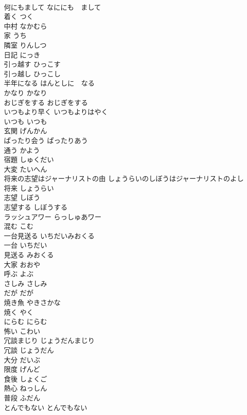 \documentclass[8pt]{extreport}
\begin{document}
\begin{CJK}{UTF8}{min}
\\	何にもまして	なににも　まして	
\\	着く	つく	
\\	中村	なかむら	
\\	家	うち	
\\	隣室	りんしつ	
\\	日記	にっき	
\\	引っ越す	ひっこす	
\\	引っ越し	ひっこし	
\\	半年になる	はんとしに　なる	
\\	かなり	かなり	
\\	おじぎをする	おじぎをする	
\\	いつもより早く	いつもよりはやく	
\\	いつも	いつも	
\\	玄関	げんかん	
\\	ぱったり会う	ぱったりあう	
\\	通う	かよう	
\\	宿題	しゅくだい	
\\	大変	たいへん	
\\	将来の志望はジャーナリストの由	しょうらいのしぼうはジャーナリストのよし	
\\	将来	しょうらい	
\\	志望	しぼう	
\\	志望する	しぼうする	
\\	ラッシュアワー	らっしゅあワー	
\\	混む	こむ	
\\	一台見送る	いちだいみおくる	
\\	一台	いちだい	
\\	見送る	みおくる	
\\	大家	おおや	
\\	呼ぶ	よぶ	
\\	さしみ	さしみ	
\\	だが	だが	
\\	焼き魚	やきさかな	
\\	焼く	やく	
\\	にらむ	にらむ	
\\	怖い	こわい	
\\	冗談まじり	じょうだんまじり	
\\	冗談	じょうだん	
\\	大分	だいぶ	
\\	限度	げんど	
\\	食後	しょくご	
\\	熱心	ねっしん	
\\	普段	ふだん	
\\	とんでもない	とんでもない	

\end{CJK}
\end{document}
